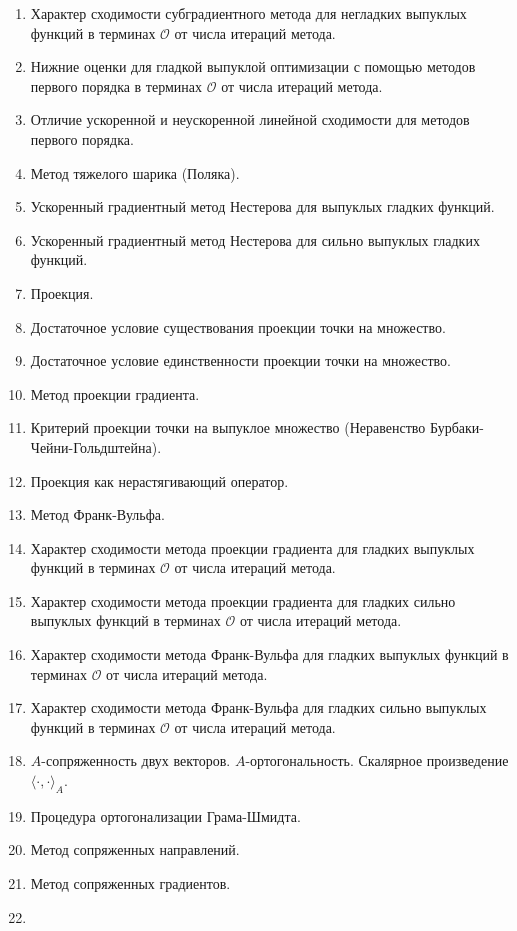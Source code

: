 \documentclass[
  letterpaper,
  DIV=11,
  numbers=noendperiod]{scrartcl}
\begin{document}
\begin{enumerate}
\item
  Характер сходимости субградиентного метода для негладких выпуклых
  функций в терминах \(\mathcal{O}\) от числа итераций метода.
\item
  Нижние оценки для гладкой выпуклой оптимизации с помощью методов
  первого порядка в терминах \(\mathcal{O}\) от числа итераций метода.
\item
  Отличие ускоренной и неускоренной линейной сходимости для методов
  первого порядка.
\item
  Метод тяжелого шарика (Поляка).
\item
  Ускоренный градиентный метод Нестерова для выпуклых гладких функций.
\item
  Ускоренный градиентный метод Нестерова для сильно выпуклых гладких
  функций.
\item
  Проекция.
\item
  Достаточное условие существования проекции точки на множество.
\item
  Достаточное условие единственности проекции точки на множество.
\item
  Метод проекции градиента.
\item
  Критерий проекции точки на выпуклое множество (Неравенство
  Бурбаки-Чейни-Гольдштейна).
\item
  Проекция как нерастягивающий оператор.
\item
  Метод Франк-Вульфа.
\item
  Характер сходимости метода проекции градиента для гладких выпуклых
  функций в терминах \(\mathcal{O}\) от числа итераций метода.
\item
  Характер сходимости метода проекции градиента для гладких сильно
  выпуклых функций в терминах \(\mathcal{O}\) от числа итераций метода.
\item
  Характер сходимости метода Франк-Вульфа для гладких выпуклых функций в
  терминах \(\mathcal{O}\) от числа итераций метода.
\item
  Характер сходимости метода Франк-Вульфа для гладких сильно выпуклых
  функций в терминах \(\mathcal{O}\) от числа итераций метода.
\item
  \(A\)-сопряженность двух векторов. \(A\)-ортогональность. Скалярное
  произведение \(\langle \cdot, \cdot \rangle_A\).
\item
  Процедура ортогонализации Грама-Шмидта.
\item
  Метод сопряженных направлений.
\item
  Метод сопряженных градиентов.
\item

\end{enumerate}
\end{document}
